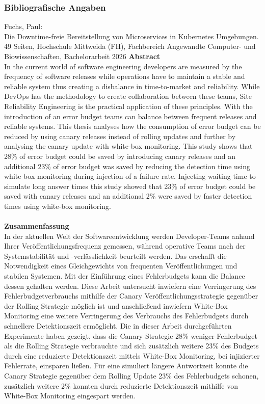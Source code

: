 \documentclass[
12pt,
a4paper,
twoside,
openright
]{report}
\begin{document}
	\subsubsection*{Bibliografische Angaben}
	Fuchs, Paul: \\ 
	Die Downtime-freie Bereitstellung von Microservices in Kubernetes Umgebungen. \\
	49 Seiten, Hochschule Mittweida (FH), Fachbereich Angewandte Computer- und Biowissenschaften, Bachelorarbeit 2026
	\vfill 
	\clearpage
	\textbf{Abstract}\\
	In the current world of software engineering developers are measured by the frequency of software releases while operations have to maintain a stable and reliable system thus creating a disbalance in time-to-market and reliability. While DevOps has the methodology to create collaboration between these teams, Site Reliability Engineering is the practical application of these principles. With the introduction of an error budget teams can balance between frequent releases and reliable systems. This thesis analyses how the consumption of error budget can be reduced by using canary releases instead of rolling updates and further by analysing the canary update with white-box monitoring. This study shows that 28\% of error budget could be saved by introducing canary releases and an additional 23\% of error budget was saved by reducing the detection time using white box monitoring during injection of a failure rate. Injecting waiting time to simulate long answer times this study showed that 23\% of error budget could be saved with canary releases and an additional 2\% were saved by faster detection times using white-box monitoring.
	\\ \\
	\textbf{Zusammenfassung}\\
	In der aktuellen Welt der Softwareentwicklung werden Developer-Teams anhand Ihrer Veröffentlichungsfrequenz gemessen, während operative Teams nach der Systemstabilität und -verlässlichkeit beurteilt werden. Das erschafft die Notwendigkeit eines Gleichgewichts von frequenten Veröffentlichungen und stabilen Systemen. Mit der Einführung eines Fehlerbudgets kann die Balance dessen gehalten werden. Diese Arbeit untersucht inwiefern eine Verringerung des Fehlerbudgetverbrauchs mithilfe der Canary Veröffentlichungsstrategie gegenüber der Rolling Strategie möglich ist und anschließend inwiefern White-Box Monitoring eine weitere Verringerung des Verbrauchs des Fehlerbudgets durch schnellere Detektionszeit ermöglicht. Die in dieser Arbeit durchgeführten Experimente haben gezeigt, dass die Canary Strategie 28\% weniger Fehlerbudget als die Rolling Strategie verbrauchte und sich zusätzlich weitere 23\% des Budgets durch eine reduzierte Detektionszeit mittels White-Box Monitoring, bei injizierter Fehlerrate, einsparen ließen. Für eine simuliert längere Antwortzeit konnte die Canary Strategie gegenüber dem Rolling Update 23\% des Fehlerbudgets schonen, zusätzlich weitere 2\% konnten durch reduzierte Detektionszeit mithilfe von White-Box Monitoring eingespart werden.
\end{document}
